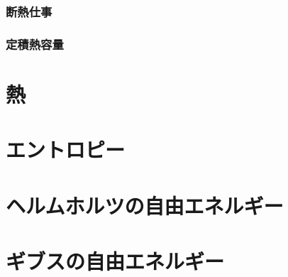 \documentclass[a4paper]{jsreport}
\begin{document}
        \subsection*{断熱仕事}

        \subsection*{定積熱容量}

    \chapter{熱}
    
    
    \chapter{エントロピー}
    
    
    \chapter{ヘルムホルツの自由エネルギー}
    
    
    \chapter{ギブスの自由エネルギー}
        
\end{document}
